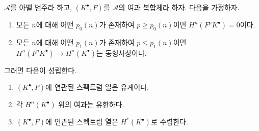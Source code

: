 \begin{lemma}
\label{lemma-ss-converges-trivial}
$\mathcal{A}$를 아벨 범주라 하고, $(K^\bullet, F)$를 $\mathcal{A}$의
여과 복합체라 하자. 다음을 가정하자.
\begin{enumerate}
\item 모든 $n$에 대해 어떤 $p_0(n)$가 존재하여 $p \geq p_0(n)$이면
$H^n(F^pK^\bullet) = 0$이다.
\item 모든 $n$에 대해 어떤 $p_1(n)$가 존재하여 $p \leq p_1(n)$이면
$H^n(F^pK^\bullet) \to H^n(K^\bullet)$는 동형사상이다.
\end{enumerate}
그러면 다음이 성립한다.
\begin{enumerate}
\item $(K^\bullet, F)$에 연관된 스펙트럼 열은 유계이다.
\item 각 $H^n(K^\bullet)$ 위의 여과는 유한하다.
\item $(K^\bullet, F)$에 연관된 스펙트럼 열은
$H^*(K^\bullet)$로 수렴한다.
\end{enumerate}
\end{lemma}


